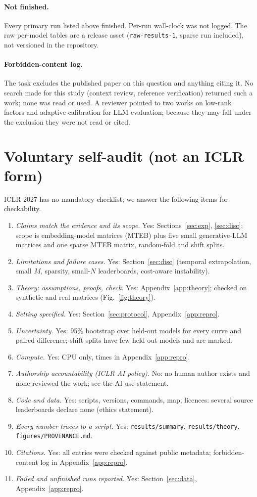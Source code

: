 \paragraph{Not finished.} Every primary run listed above finished. Per-run wall-clock was not logged. The raw per-model tables are a release asset (\texttt{raw-results-1}, sparse run included), not versioned in the repository.
\paragraph{Forbidden-content log.} The task excludes the published paper on this question and anything citing it. No search made for this study (context review, reference verification) returned such a work; none was read or used. A reviewer pointed to two works on low-rank factors and adaptive calibration for LLM evaluation; because they may fall under the exclusion they were not read or cited.

\section{Voluntary self-audit (not an ICLR form)}
\label{app:audit}
ICLR 2027 has no mandatory checklist; we answer the following items for checkability.
\begin{enumerate}\itemsep0pt
\item \emph{Claims match the evidence and its scope.} Yes: Sections~\ref{sec:exp}, \ref{sec:disc}; scope is embedding-model matrices (MTEB) plus five small generative-LLM matrices and one sparse MTEB matrix, random-fold and shift splits.
\item \emph{Limitations and failure cases.} Yes: Section~\ref{sec:disc} (temporal extrapolation, small $M$, sparsity, small-$N$ leaderboards, cost-aware instability).
\item \emph{Theory: assumptions, proofs, check.} Yes: Appendix~\ref{app:theory}; checked on synthetic and real matrices (Fig.~\ref{fig:theory}).
\item \emph{Setting specified.} Yes: Section~\ref{sec:protocol}, Appendix~\ref{app:repro}.
\item \emph{Uncertainty.} Yes: 95\% bootstrap over held-out models for every curve and paired difference; shift splits have few held-out models and are marked.
\item \emph{Compute.} Yes: CPU only, times in Appendix~\ref{app:repro}.
\item \emph{Authorship accountability (ICLR AI policy).} No: no human author exists and none reviewed the work; see the AI-use statement.
\item \emph{Code and data.} Yes: scripts, versions, commands, map; licences: several source leaderboards declare none (ethics statement).
\item \emph{Every number traces to a script.} Yes: \texttt{results/summary}, \texttt{results/theory}, \texttt{figures/PROVENANCE.md}.
\item \emph{Citations.} Yes: all entries were checked against public metadata; forbidden-content log in Appendix~\ref{app:repro}.
\item \emph{Failed and unfinished runs reported.} Yes: Section~\ref{sec:data}, Appendix~\ref{app:repro}.
\end{enumerate}
